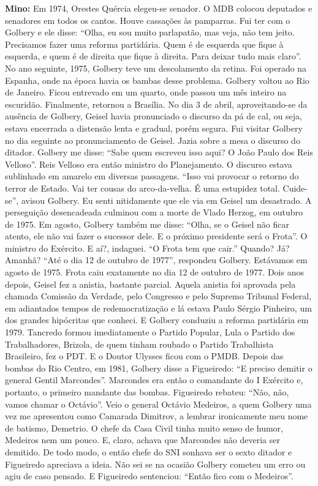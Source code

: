 \textbf{Mino:} Em 1974, Orestes Quércia elegeu-se senador. O MDB colocou
deputados e senadores em todos os cantos. Houve cassações às pamparras.
Fui ter com o Golbery e ele disse: ``Olha, eu sou muito parlapatão, mas
veja, não tem jeito. Precisamos fazer uma reforma partidária. Quem é de
esquerda que fique à esquerda, e quem é de direita que fique à direita.
Para deixar tudo mais claro''. No ano seguinte, 1975, Golbery teve um
descolamento da retina. Foi operado na Espanha, onde na época havia os
bambas desse problema. Golbery voltou ao Rio de Janeiro. Ficou entrevado
em um quarto, onde passou um mês inteiro na escuridão. Finalmente,
retornou a Brasília. No dia 3 de abril, aproveitando-se da ausência de
Golbery, Geisel havia pronunciado o discurso da pá de cal, ou seja,
estava encerrada a distensão lenta e gradual, porém segura. Fui visitar
Golbery no dia seguinte ao pronunciamento de Geisel. Jazia sobre a mesa
o discurso do ditador. Golbery me disse: ``Sabe quem escreveu isso aqui?
O João Paulo dos Reis Velloso''. Reis Velloso era então ministro do
Planejamento. O discurso estava sublinhado em amarelo em diversas
passagens. ``Isso vai provocar o retorno do terror de Estado. Vai ter
cousas do arco-da-velha. É uma estupidez total. Cuide-se'', avisou
Golbery. Eu senti nitidamente que ele via em Geisel um desastrado. A
perseguição desencadeada culminou com a morte de Vlado Herzog, em
outubro de 1975. Em agosto, Golbery também me disse: ``Olha, se o Geisel
não ficar atento, ele não vai fazer o sucessor dele. E o próximo
presidente será o Frota''. O ministro do Exército. E aí?, indaguei. ``O
Frota tem que cair.'' Quando? Já? Amanhã? ``Até o dia 12 de outubro de
1977'', respondeu Golbery. Estávamos em agosto de 1975. Frota caiu
exatamente no dia 12 de outubro de 1977. Dois anos depois, Geisel fez a
anistia, bastante parcial. Aquela anistia foi aprovada pela chamada
Comissão da Verdade, pelo Congresso e pelo Supremo Tribunal Federal, em
adiantados tempos de redemocratização e lá estava Paulo Sérgio Pinheiro,
um dos grandes hipócritas que conheci. E Golbery conduziu a reforma
partidária em 1979. Tancredo formou imediatamente o Partido Popular,
Lula o Partido dos Trabalhadores, Brizola, de quem tinham roubado o
Partido Trabalhista Brasileiro, fez o PDT. E o Doutor Ulysses ficou com
o PMDB. Depois das bombas do Rio Centro, em 1981, Golbery disse a
Figueiredo: ``E preciso demitir o general Gentil Marcondes''. Marcondes
era então o comandante do I Exército e, portanto, o primeiro mandante
das bombas. Figueiredo rebateu: ``Não, não, vamos chamar o Octávio''.
Veio o general Octávio Medeiros, a quem Golbery uma vez me apresentou
como Camarada Dimitrov, a lembrar ironicamente meu nome de batismo,
Demetrio. O chefe da Casa Civil tinha muito senso de humor, Medeiros nem
um pouco. E, claro, achava que Marcondes não deveria ser demitido. De
todo modo, o então chefe do SNI sonhava ser o sexto ditador e Figueiredo
apreciava a ideia. Não sei se na ocasião Golbery cometeu um erro ou agiu
de caso pensado. E Figueiredo sentenciou: ``Então fico com o Medeiros''.

